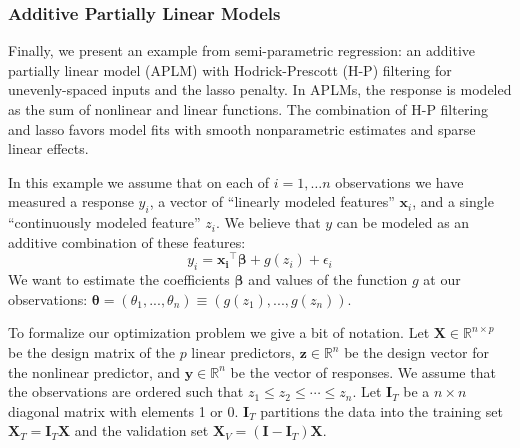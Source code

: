 \documentclass[10pt,letterpaper]{article}
\begin{document}
\subsubsection{Additive Partially Linear Models}\label{sec:aplm}

Finally, we present an example from semi-parametric regression: an additive partially linear model (APLM) with Hodrick-Prescott (H-P) filtering for unevenly-spaced inputs and the lasso penalty. In APLMs, the response is modeled as the sum of nonlinear and linear functions.  The combination of H-P filtering and lasso favors model fits with smooth nonparametric estimates and sparse linear effects.

In this example we assume that on each of $i=1,\ldots n$ observations we have measured a response $y_i$, a vector of ``linearly modeled features'' $\boldsymbol{x}_i$, and a single ``continuously modeled feature'' $z_i$. We believe that $y$ can be modeled as an additive combination of these features:
\begin{equation}
y_i = \boldsymbol{x_i}^\top \boldsymbol{\beta} + g(z_i) + \epsilon_i
\end{equation}
We want to estimate the coefficients $\boldsymbol{\beta}$ and values of the function $g$ at our observations: $\boldsymbol{\theta} = (\theta_1, ..., \theta_n) \equiv (g(z_1), ..., g(z_n))$.

To formalize our optimization problem we give a bit of notation. Let $\boldsymbol{X} \in \mathbb{R}^{n \times p}$ be the design matrix of the $p$ linear predictors, $\boldsymbol{z} \in \mathbb{R}^n$ be the design vector for the nonlinear predictor, and $\boldsymbol{y} \in \mathbb{R}^n$ be the vector of responses. We assume that the observations are ordered such that $z_1 \le z_2 \le \cdots \le z_n$. Let $\boldsymbol{I}_T$ be a $n \times n$ diagonal matrix with elements 1 or 0. $\boldsymbol{I}_T$ partitions the data into the training set $\boldsymbol{X}_T= \boldsymbol{I}_T \boldsymbol{X}$ and the validation set $\boldsymbol{X}_V= (\boldsymbol{I} - \boldsymbol{I}_T) \boldsymbol{X}$.
\end{document}
